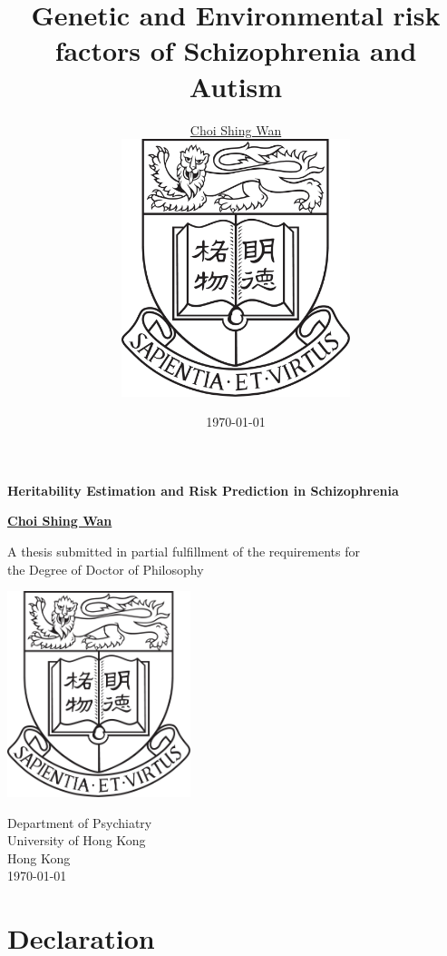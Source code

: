 \documentclass{book}
\title{Genetic and Environmental risk factors of Schizophrenia and Autism}
\date{\today}
\author{\href{mailto:choishingwan@gmail.com}{Choi Shing Wan}\\
	\includegraphics[width=0.5\textwidth]{hkuLogo.jpg}}
\begin{document}
\thispagestyle{empty}
\pagestyle{empty}

\begin{titlepage}
	\begin{center}
		\vspace*{1cm}
		
		\Huge
		\textbf{Heritability Estimation and Risk Prediction in Schizophrenia}
		
		\vspace{0.5cm}
		\LARGE
		
		\vspace{1.5cm}
		
		\textbf{\href{mailto:choishingwan@gmail.com}{Choi Shing Wan}}
		
		\vfill
		
		A thesis submitted in partial fulfillment of the requirements for \\
		the Degree of Doctor of Philosophy
		
		\vspace{0.8cm}
		
		\includegraphics[width=0.4\textwidth]{figure/hkuLogo.jpg}
		
		\Large
		Department of Psychiatry\\
		University of Hong Kong\\
		Hong Kong\\
		\today
		
	\end{center}
\end{titlepage}


\frontmatter 

	\cleardoublepage
	\chapter*{Declaration}
	\cleardoublepage
\end{document}
